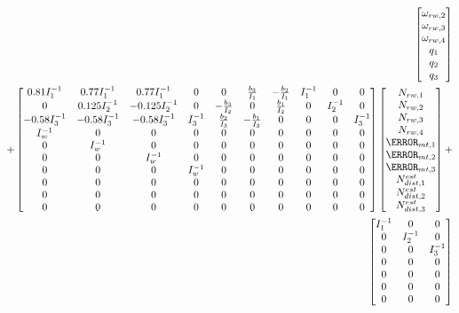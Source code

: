 \begin{align}
\begin{bmatrix}
\omega_{rw,2} \\
\omega_{rw,3} \\
\omega_{rw,4} \\
q_1 \\
q_2 \\
q_3 
\end{bmatrix}
\\
\nonumber
+
\begin{bmatrix}
0.81I_1^{-1} & 0.77I_1^{-1} & 0.77I_1^{-1} & 0 & 0 & \frac{b_3}{I_1} & -\frac{b_2}{I_1}	& I_1^{-1} & 0 & 0\\
0 & 0.125I_2^{-1} & -0.125I_2^{-1} & 0 & - \frac{b_3}{I_2} & 0 &  \frac{b_1}{I_2} & 0 & I_2^{-1} & 0\\ 
-0.58I_3^{-1} & -0.58 I_3^{-1} & -0.58 I_3^{-1} & I_3^{-1} &  \frac{b_2}{I_3} &  -\frac{b_1}{I_3} & 0 & 0 & 0 & I_3^{-1} \\  
I_w^{-1} & 0 & 0& 0 & 0 & 0 & 0 & 0 & 0 & 0 \\
0 & I_w^{-1} & 0& 0 & 0 & 0 & 0 & 0 & 0 & 0 \\ 
0 & 0 & I_w^{-1} & 0 & 0 & 0 & 0 & 0 & 0 & 0\\  
0 & 0 & 0 &  I_w^{-1} & 0& 0 & 0 & 0 & 0 & 0\\
0 & 0 & 0 & 0 & 0& 0 & 0 & 0 & 0 & 0\\
0 & 0 & 0 & 0 & 0& 0 & 0 & 0 & 0 & 0\\
0 & 0 & 0 & 0 & 0& 0 & 0 & 0 & 0 & 0
\end{bmatrix}
\begin{bmatrix}
N_{rw,1} \\
N_{rw,2} \\
N_{rw,3}\\
N_{rw,4}\\
\m_{mt,1} \\
\m_{mt,2} \\
\m_{mt,3} \\
N^{est}_{dist,1} \\
N^{est}_{dist,2} \\
N^{est}_{dist,3}
\end{bmatrix}
+
\\
\nonumber
\begin{bmatrix}
I_1^{-1} & 0 & 0 \\
0 & I_2^{-1} & 0 \\
0 & 0 & I_3^{-1}\\
0 & 0 & 0 \\
0 & 0 & 0 \\
0 & 0 & 0 \\
0 & 0 & 0 \\

\end{bmatrix}
\end{align}
